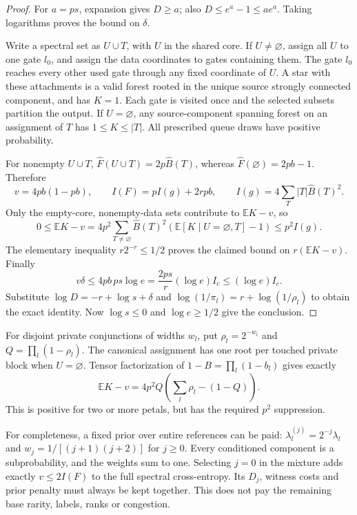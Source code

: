 \documentclass[11pt]{article}
\newcommand{\E}{\mathbb E}
\begin{document}
\begin{proof}
For $a=ps$, expansion gives $D\ge a$; also
$D\le e^a-1\le ae^a$. Taking logarithms proves the bound on $\delta$.

Write a spectral set as $U\cup T$, with $U$ in the shared core. If
$U\ne\varnothing$, assign all $U$ to one gate $l_0$, and assign the data
coordinates to gates containing them. The gate $l_0$ reaches every other
used gate through any fixed coordinate of $U$. A star with these
attachments is a valid forest rooted in the unique source strongly
connected component, and has $K=1$. Each gate is visited once and the
selected subsets partition the output. If $U=\varnothing$, any
source-component spanning forest on an assignment of $T$ has
$1\le K\le |T|$. All prescribed queue draws have positive probability.

For nonempty $U\cup T$, $\widehat F(U\cup T)=2p\widehat B(T)$, whereas
$\widehat F(\varnothing)=2pb-1$. Therefore
\[
 v=4pb(1-pb),\qquad I(F)=pI(g)+2rpb,
 \qquad I(g)=4\sum_T|T|\widehat B(T)^2.
\]
Only the empty-core, nonempty-data sets contribute to $\E K-v$, so
\[
 0\le\E K-v
 =4p^2\sum_{T\ne\varnothing}\widehat B(T)^2
     (\E[K\mid U=\varnothing,T]-1)
 \le p^2I(g).
\]
The elementary inequality $r2^{-r}\le1/2$ proves the claimed bound on
$r(\E K-v)$. Finally
\[
 v\delta\le4pb\,ps\log e
   =\frac{2ps}{r}(\log e)I_c\le(\log e)I_c.
\]
Substitute $\log D=-r+\log s+\delta$ and
$\log(1/\pi_l)=r+\log(1/\rho_l)$ to obtain the exact identity.
Now $\log s\le0$ and $\log e\ge1/2$ give the conclusion.
\end{proof}

For disjoint private conjunctions of widths $w_l$, put
$\rho_l=2^{-w_l}$ and $Q=\prod_l(1-\rho_l)$. The canonical assignment
has one root per touched private block when $U=\varnothing$. Tensor
factorization of $1-B=\prod_l(1-b_l)$ gives exactly
\[
 \E K-v=4p^2Q\left(\sum_l\rho_l-(1-Q)\right).
\]
This is positive for two or more petals, but has the required $p^2$
suppression.

For completeness, a fixed prior over entire references can be paid:
$\lambda_l^{(j)}=2^{-j}\lambda_l$ and
$w_j=1/[(j+1)(j+2)]$ for $j\ge0$. Every conditioned component is a
subprobability, and the weights sum to one. Selecting $j=0$ in the
mixture adds exactly $v\le2I(F)$ to the full spectral cross-entropy.
Its $D_j$, witness costs and prior penalty must always be kept together.
This does not pay the remaining base rarity, labels, ranks or congestion.
\end{document}
